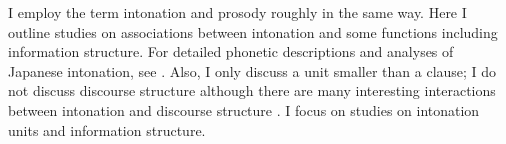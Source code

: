 I employ the term intonation and prosody roughly in the same way.
Here I outline studies on associations between intonation and some functions including information structure.
For detailed phonetic descriptions and analyses of Japanese intonation,
see .%
Also, I only discuss a unit smaller than a clause;
I do not discuss discourse structure
although there are many interesting interactions between intonation and discourse structure \cite[e.g.,][]{nakajimaallen93,vendittiswerts96,muraiyamashita99,koisoetal03,okuboetal03,koisoishimoto12}.
I focus on 
studies on intonation units and information structure.

